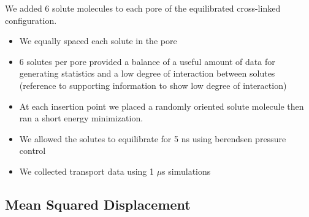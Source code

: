 \documentclass{article}
\begin{document}
  \noindent We added 6 solute molecules to each pore of the equilibrated cross-linked
  configuration.
  \begin{itemize}
	\item We equally spaced each solute in the pore
	\item 6 solutes per pore provided a balance of a useful amount of data
	for generating statistics and a low degree of interaction between solutes (reference
	to supporting information to show low degree of interaction)
	\item At each insertion point we placed a randomly oriented solute molecule
	then ran a short energy minimization.
	\item We allowed the solutes to equilibrate for 5 ns using berendsen 
	pressure control
	\item We collected transport data using 1 $\mu$s simulations
  \end{itemize}
  
  \subsection*{Mean Squared Displacement}\label{method:MSD}
\end{document}
